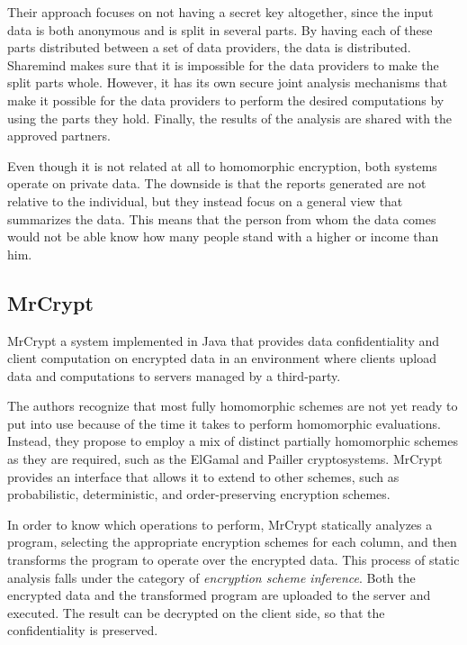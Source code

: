 Their approach focuses on not having a secret key altogether, since the input data is both anonymous and is split in several parts. By having each of these parts distributed between a set of data providers, the data is distributed. Sharemind makes sure that it is impossible for the data providers to make the split parts whole. However, it has its own secure joint analysis mechanisms that make it possible for the data providers to perform the desired computations by using the parts they hold. Finally, the results of the analysis are shared with the approved partners.

Even though it is not related at all to homomorphic encryption, both systems operate on private data. The downside is that the reports generated are not relative to the individual, but they instead focus on a general view that summarizes the data. This means that the person from whom the data comes would not be able know how many people stand with a higher or income than him.

\subsection{MrCrypt}
MrCrypt \cite{Tetali:2013:MSA:2544173.2509554} a system implemented in Java that provides data confidentiality and client computation on encrypted data in an environment where clients upload data and computations to servers managed by a third-party.

The authors recognize that most fully homomorphic schemes are not yet ready to put into use because of the time it takes to perform homomorphic evaluations. Instead, they propose to employ a mix of distinct partially homomorphic schemes as they are required, such as the ElGamal \cite{ElGamal:1985:PKC:19478.19480} and Pailler \cite{Paillier:1999:PCB:1756123.1756146} cryptosystems. MrCrypt provides an interface that allows it to extend to other schemes, such as probabilistic, deterministic, and order-preserving encryption schemes. 

In order to know which operations to perform, MrCrypt statically analyzes a program, selecting the appropriate encryption schemes for each column, and then transforms the program to operate over the encrypted data. This process of static analysis falls under the category of \emph{encryption scheme inference}. Both the encrypted data and the transformed program are uploaded to the server and executed. The result can be decrypted on the client side, so that the confidentiality is preserved.

